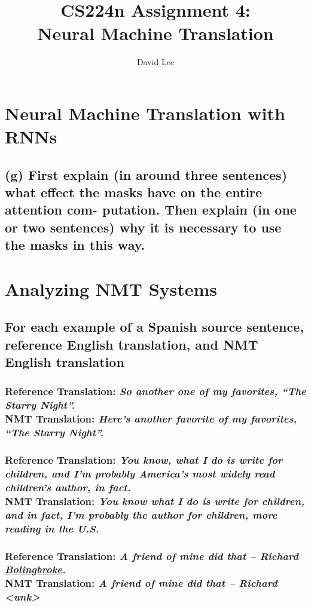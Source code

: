 \documentclass[12pt, letterpaper]{article}
\title{CS224n Assignment 4: \\ Neural Machine Translation}
\author{David Lee}
\begin{document}
\maketitle

\section{Neural Machine Translation with RNNs}
\subsection*{(g) First explain (in around three sentences) what effect the masks have on the entire attention com- putation. Then explain (in one or two sentences) why it is necessary to use the masks in this way.}

\section{Analyzing NMT Systems}
\subsection{For each example of a Spanish source sentence, reference English translation, and NMT English translation}
\subsubsection{\textbf{Reference Translation}: \textit{So another one of my favorites, “The Starry Night”.} \\ \textbf{NMT Translation}: \textit{Here’s another favorite of my favorites, “The Starry Night”.}}

\subsubsection{\textbf{Reference Translation}: \textit{You know, what I do is write for children, and I’m probably America’s most widely read children’s author, in fact.} \\ \textbf{NMT Translation}: \textit{You know what I do is write for children, and in fact, I’m probably the author for children, more reading in the U.S.}}

\subsubsection{\textbf{Reference Translation}: \textit{A friend of mine did that – Richard \underline{Bolingbroke}.} \\ \textbf{NMT Translation}: \textit{A friend of mine did that – Richard <unk>}}
\end{document}
